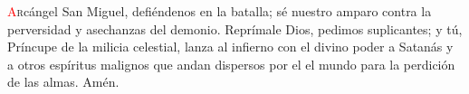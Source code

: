 \lettrine[lines=2]{\textcolor{red}{A}}rcángel San Miguel, defiéndenos en la batalla; sé nuestro amparo contra la perversidad y asechanzas del demonio. Reprímale Dios, pedimos
suplicantes; y tú, Príncupe de la milicia celestial, lanza al infierno con el divino poder a Satanás y a otros espíritus malignos que andan dispersos por el
el mundo para la perdición de las almas. Amén.